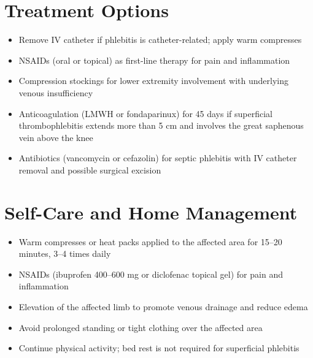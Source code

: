 \section*{Treatment Options}
\begin{itemize}
  \item Remove IV catheter if phlebitis is catheter-related; apply warm compresses
  \item NSAIDs (oral or topical) as first-line therapy for pain and inflammation
  \item Compression stockings for lower extremity involvement with underlying venous insufficiency
  \item Anticoagulation (LMWH or fondaparinux) for 45 days if superficial thrombophlebitis extends more than 5 cm and involves the great saphenous vein above the knee
  \item Antibiotics (vancomycin or cefazolin) for septic phlebitis with IV catheter removal and possible surgical excision
\end{itemize}

\section*{Self-Care and Home Management}
\begin{itemize}
  \item Warm compresses or heat packs applied to the affected area for 15--20 minutes, 3--4 times daily
  \item NSAIDs (ibuprofen 400--600 mg or diclofenac topical gel) for pain and inflammation
  \item Elevation of the affected limb to promote venous drainage and reduce edema
  \item Avoid prolonged standing or tight clothing over the affected area
  \item Continue physical activity; bed rest is not required for superficial phlebitis
\end{itemize}


